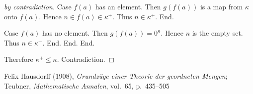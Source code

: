 \documentclass{article}
\begin{document}
\begin{forthel}
\begin{proof}[by contradiction]
          Case $f(a)$ has an element.
            Then $g(f(a))$ is a map from $\kappa$ onto $f(a)$.
            Hence $n \in f(a) \in \kappa^{+}$.
            Thus $n \in \kappa^{+}$.
          End.

          Case $f(a)$ has no element.
            Then $g(f(a)) = 0^{\kappa}$.
            Hence $n$ is the empty set.
            Thus $n \in \kappa^{+}$.
          End.
        End.
      End.

      Therefore $\kappa^{+} \leq \kappa$.
      Contradiction.
    \end{proof}
  \end{forthel}

  \begin{thebibliography}{1}
     Felix Hausdorff (1908),
      \textit{Grundzüge einer Theorie der geordneten Mengen};
      Teubner, \textit{Mathematische Annalen}, vol.~65, p.~435--505
  \end{thebibliography}
\end{document}
